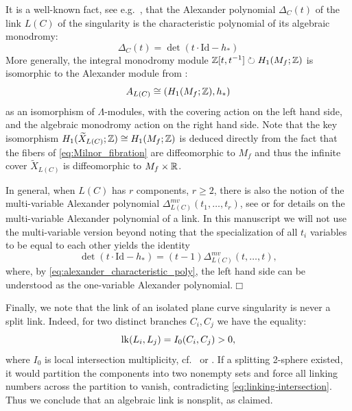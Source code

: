 It is a well-known fact, see e.g.~\cite[Section 2]{Durfee1975}, that the Alexander polynomial $\Delta_C(t)$ of the link $L(C)$ of the singularity is the characteristic polynomial of its algebraic monodromy:
\begin{equation}\label{eq:alexander_characteristic_poly}
\Delta_C(t)=\det(t\cdot\mbox{Id}-h_*)
\end{equation}
More generally, the integral monodromy module $\mathbb Z[t,t^{-1}]\circlearrowright H_1(M_f;\mathbb Z)$ is isomorphic to the Alexander module from :
\begin{equation}\label{eq:alexander_module_monodromy}
A_{L(C)}\cong (H_1(M_f;\mathbb Z),h_*)
\end{equation}
as an isomorphism of $\Lambda$-modules, with the covering action on the left hand side, and the algebraic monodromy action on the right hand side. Note that the key isomorphism $H_1(\widetilde{X}_{L(C)};\mathbb Z)\cong H_1(M_f;\mathbb Z)$ is deduced directly from the fact that the fibers of \eqref{eq:Milnor_fibration} are diffeomorphic to $M_f$ and thus the infinite cover $\widetilde{X}_{L(C)}$ is diffeomorphic to $M_f\times\mathbb R$.

\begin{remark}\label{rmk:multivariable_Alexander}
In general, when $L(C)$ has $r$ components, $r\geq2$, there is also the notion of the multi-variable Alexander polynomial $\Delta_{L(C)}^{mv}(t_1,\ldots,t_r)$, see \cite{CDGZ,EisenbudNeumann1985} or \cite{Yamamoto1984} for details on the multi-variable Alexander polynomial of a link. In this manuscript we will not use the multi-variable version beyond noting that the specialization of all $t_i$ variables to be equal to each other yields the identity
$$\det(t\cdot\mbox{Id}-h_*)=(t-1)\Delta_{L(C)}^{mv}(t,\ldots,t),$$
where, by \eqref{eq:alexander_characteristic_poly}, the left hand side can be understood as the one-variable Alexander polynomial.\hfill$\Box$
\end{remark}

Finally, we note that the link of an isolated plane curve singularity is never a split link. Indeed, for two distinct branches $C_i,C_j$ we have the equality:
\begin{equation}\label{eq:linking-intersection}
   \operatorname{lk}(L_i,L_j)=I_0(C_i,C_j)>0,
\end{equation}
where $I_0$ is local intersection multiplicity, cf.~\cite[Chapter~V]{EisenbudNeumann1985} or \cite[Chapters~4\&5]{wall2004}. If a splitting 2-sphere existed, it would partition the components into two nonempty sets and force all linking numbers across the partition to vanish, contradicting \eqref{eq:linking-intersection}. Thus we conclude that an algebraic link is nonsplit, as claimed.\\

